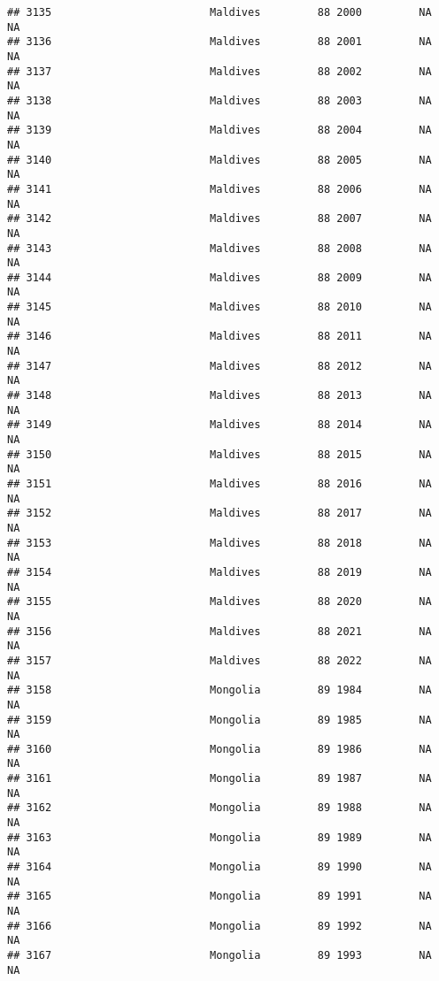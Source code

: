 \documentclass[
]{article}
\begin{document}
\begin{verbatim}
## 3135                         Maldives         88 2000         NA         NA
## 3136                         Maldives         88 2001         NA         NA
## 3137                         Maldives         88 2002         NA         NA
## 3138                         Maldives         88 2003         NA         NA
## 3139                         Maldives         88 2004         NA         NA
## 3140                         Maldives         88 2005         NA         NA
## 3141                         Maldives         88 2006         NA         NA
## 3142                         Maldives         88 2007         NA         NA
## 3143                         Maldives         88 2008         NA         NA
## 3144                         Maldives         88 2009         NA         NA
## 3145                         Maldives         88 2010         NA         NA
## 3146                         Maldives         88 2011         NA         NA
## 3147                         Maldives         88 2012         NA         NA
## 3148                         Maldives         88 2013         NA         NA
## 3149                         Maldives         88 2014         NA         NA
## 3150                         Maldives         88 2015         NA         NA
## 3151                         Maldives         88 2016         NA         NA
## 3152                         Maldives         88 2017         NA         NA
## 3153                         Maldives         88 2018         NA         NA
## 3154                         Maldives         88 2019         NA         NA
## 3155                         Maldives         88 2020         NA         NA
## 3156                         Maldives         88 2021         NA         NA
## 3157                         Maldives         88 2022         NA         NA
## 3158                         Mongolia         89 1984         NA         NA
## 3159                         Mongolia         89 1985         NA         NA
## 3160                         Mongolia         89 1986         NA         NA
## 3161                         Mongolia         89 1987         NA         NA
## 3162                         Mongolia         89 1988         NA         NA
## 3163                         Mongolia         89 1989         NA         NA
## 3164                         Mongolia         89 1990         NA         NA
## 3165                         Mongolia         89 1991         NA         NA
## 3166                         Mongolia         89 1992         NA         NA
## 3167                         Mongolia         89 1993         NA         NA

\end{verbatim}
\end{document}
